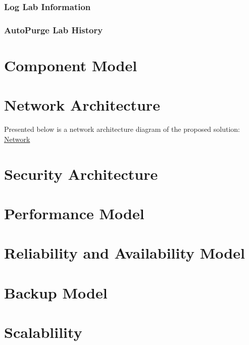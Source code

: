 \documentclass[11pt]{article}
\begin{document}
\subsubsection{Log Lab Information}
\label{sec-3.4.1}

\subsubsection{AutoPurge Lab History}
\label{sec-3.4.2}


\section{Component Model}
\label{sec-4}

\section{Network Architecture}
\label{sec-5}

  Presented below is a network architecture diagram of the proposed
  solution:
   \href{file://../network-infrastructure.jpg }{Network}
\section{Security Architecture}
\label{sec-6}

\section{Performance Model}
\label{sec-7}

\section{Reliability and Availability Model}
\label{sec-8}

\section{Backup Model}
\label{sec-9}

\section{Scalablility}
\label{sec-10}
\end{document}
